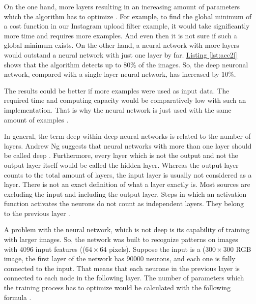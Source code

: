 On the one hand, more layers resulting in an increasing amount of parameters which the algorithm has to optimize \cite[p. 21]{Goodfellow-et-al-2016}. For example, to find the global minimum of a cost function in our Instagram upload filter example, it would take significantly more time and requires more examples. And even then it is not sure if such a global minimum exists. On the other hand, a neural network with more layers would outstand a neural network with just one layer by far. \hyperref[lst:acc2l]{Listing \ref{lst:acc2l}} shows that the algorithm detects up to 80\% of the images. So, the deep neuronal network, compared with a single layer neural network, has increased by 10\%.

The results could be better if more examples were used as input data. The required time and computing capacity would be comparatively low with such an implementation. That is why the neural network is just used with the same amount of examples  \cite[p.167]{Goodfellow-et-al-2016} \cite[p.995 - 997]{Murphy2012}.

In general, the term deep within deep neural networks is related to the number of layers. Andrew Ng suggests that neural networks with more than one layer should be called deep \cite{AndrewNG}. Furthermore, every layer which is not the output and not the output layer itself would be called the hidden layer. Whereas the output layer counts to the total amount of layers, the input layer is usually not considered as a layer. There is not an exact definition of what a layer exactly is. Most sources are excluding the input and including the output layer. Steps in which an activation function activates the neurons do not count as independent layers. They belong to the previous layer \cite{AndrewNG} \cite{Kriesel2007NeuralNetworks} \cite{Goodfellow-et-al-2016}.

A problem with the neural network, which is not deep is its capability of training with larger images. So, the network was built to recognize patterns on images with 4096 input features ((\( 64 \times 64\) pixels). Suppose the input is a (\( 300 \times 300\) RGB image, the first layer of the network has 90000 neurons, and each one is fully connected to the input. That means that each neurone in the previous layer is connected to each node in the following layer. The number of parameters which the training process has to optimize would be calculated with the following formula \cite{Vasudev2019}\cite{DBLP:journals/corr/TraskGR15}.

